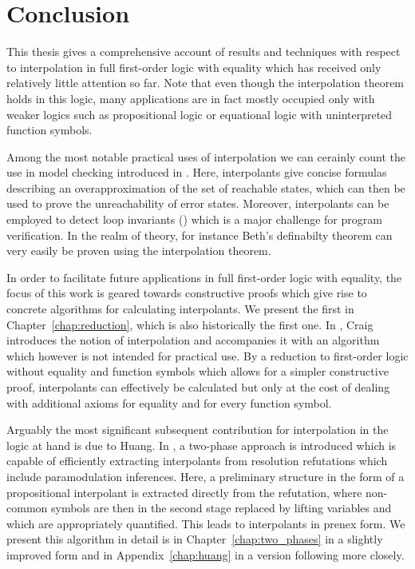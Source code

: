 \chapter{Conclusion}

This thesis gives a comprehensive account of results and techniques with respect to interpolation in full first-order logic with equality which has received only relatively little attention so far. 
Note that even though the interpolation theorem holds in this logic, %
many applications are in fact mostly occupied only with weaker logics such as propositional logic or equational logic with uninterpreted function symbols.

Among the most notable practical uses of interpolation we can cerainly count the use in model checking introduced in \cite{McMillan03}.
Here, interpolants give concise formulas describing an overapproximation of the set of reachable states, which can then be used to prove the unreachability of error states.
Moreover, interpolants can be employed to detect loop invariants (\cite{weissenbacher2010}) which is a major challenge for program verification.
In the realm of theory, for instance Beth's definabilty theorem can very easily be proven using the interpolation theorem.

In order to facilitate future applications in full first-order logic with equality, the focus of this work is geared towards constructive proofs which give rise to concrete algorithms for calculating interpolants.
We present the first in Chapter~\ref{chap:reduction}, which is also historically the first one.
In \cite{Craig57linear,Craig57three}, Craig introduces the notion of interpolation and accompanies it with an algorithm which however is not intended for practical use.
By a reduction to first-order logic without equality and function symbols which allows for a simpler constructive proof, interpolants can effectively be calculated but only at the cost of dealing with additional axioms for equality and for every function symbol.

Arguably the most significant subsequent contribution for interpolation in the logic at hand is due to Huang.
In \cite{Huang95}, a two-phase approach is introduced which is capable of efficiently extracting interpolants from resolution refutations which include paramodulation inferences.
Here, a preliminary structure in the form of a propositional interpolant is extracted directly from the refutation, where non-common symbols are then in the second stage replaced by lifting variables and which are appropriately quantified.
This leads to interpolants in prenex form.
We present this algorithm in detail is in Chapter~\ref{chap:two_phases} in a slightly improved form and in Appendix~\ref{chap:huang} in a version following \cite{Huang95} more closely.

